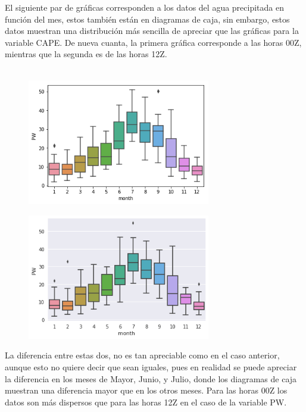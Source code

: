 \documentclass{article}
\begin{document}
El siguiente par de gráficas corresponden a los datos del agua precipitada en función del mes, estos también están en diagramas de caja, sin embargo, estos datos muestran una distribución más sencilla de apreciar que las gráficas para la variable CAPE. De nueva cuanta, la primera gráfica corresponde a las horas 00Z, mientras que la segunda es de las horas 12Z. \\
\\ 

\begin{figure}[htb]
    \begin{center}
    \includegraphics[width=8cm]{BoxPlotSea00Z.png} 
    \end{center}
\end{figure}

\begin{figure}[htb]
    \begin{center}
    \includegraphics[width=8cm]{BoxPlotS12Z.png} 
    \end{center}
\end{figure}

La diferencia entre estas dos, no es tan apreciable como en el caso anterior, aunque esto no quiere decir que sean iguales, pues en realidad se puede apreciar la diferencia en los meses de Mayor, Junio, y Julio, donde los diagramas de caja muestran una diferencia mayor que en los otros meses. Para las horas 00Z los datos son más dispersos que para las horas 12Z en el caso de la variable PW. \\ 
\end{document}
